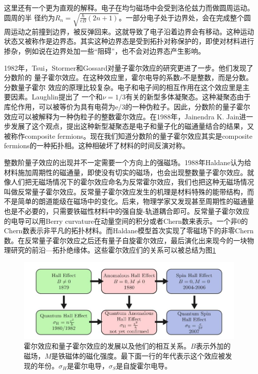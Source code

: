 这里还有一个更为直观的解释。电子在均匀磁场中会受到洛伦兹力而做圆周运动。圆周的半
径约为$R_n = \sqrt{\frac{\hbar}{eB}(2 n + 1)}$。一部分电子处于边界处，会在完成整个圆周运动之前撞到边界，被反弹回来。这就导致了电子沿着边界会有移动。这种运动状态又被称作是边界态。其实这种边界态是受到拓扑对称保护的，即使对材料进行掺杂，例如说在边界处加一些“阻碍”，也不会对边界态产生影响。

1982年，Tsui，Stormer和Gossard对量子霍尔效应的研究更进了一步。他们发现了分数阶的
量子霍尔效应\cite{fracHall}。在这种效应里，霍尔电导的系数$\nu$不是整数，而是分数。分数量子霍尔
效应的原理比较复杂。电子和电子间的相互作用在这个效应里是主要因素。Laughlin提出了
一个和$\nu = 1 / 3$有关的新型多体凝聚态\cite{newCondense}。这种凝聚态由于库伦作用，可以被等价为具有电荷为e/3的一种伪粒子。因此，分数阶的量子霍尔效应可以被解释为一种伪粒子的整数霍尔效应。在1988年，Jainendra K. Jain进一步发展了这个观点，提出这种新型凝聚态是电子和量子化的磁通量结合的结果，又被称作composite fermions\cite{compositeF}。现在我们知道分数阶的量子霍尔效应其实是composite fermions的一种拓扑相。这种相破坏了材料的时间反演对称。
  
整数阶量子效应的出现并不一定需要一个方向上的强磁场。1988年Haldane认为给材料施加周期性的磁通量，即使没有切实的磁场，也会出现整数量子霍尔效应\cite{haldane}。就像人们把无磁场情况下的霍尔效应命名为反常霍尔效应，我们也把这种无磁场情况叫做反常量子霍尔效应。反常量子霍尔效应发生的机理是材料特殊的能带结构，而不是简单的朗道能级在磁场中的变化。后来，物理学家又发现甚至周期性的磁通量也是不必要的，只需要铁磁性材料中的强自旋-轨道耦合即可。反常量子霍尔效应的电导可以用Berry curvature在动量空间的积分或者Chern数来表示\cite{anomaQt}。一个非0的Chern数表示非平凡的拓扑材料。而Haldane模型首次实现了零磁场下的非零Chern数。在反常量子霍尔效应之后还有量子自旋霍尔效应，最后演化出来现今的一块物理研究的前沿—拓扑绝缘体。这些霍尔效应们的关系可以被总结为图\ref{hallRelation}
  
 \begin {figure}[btp]
\centering 
\includegraphics[width=12cm]{./images/hallRelation.jpg} 
\caption{霍尔效应和量子霍尔效应的发展以及他们的相互关系。$B$表示外加的磁场，$M$是铁磁体的磁化强度。最下面一行的年代表示这个效应被发现的年份。$\sigma_H$是霍尔电导，$\sigma_S$是自旋霍尔电导。\cite{topoText}}
\label{hallRelation}
\end {figure} 
  
